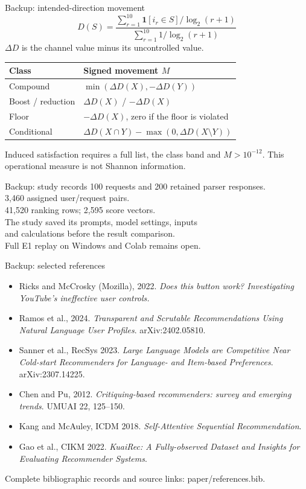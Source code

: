 \documentclass[10pt]{beamer}
\newcommand{\toprule}{\hline}
\newcommand{\midrule}{\hline}
\newcommand{\bottomrule}{\hline}
\newcommand{\src}[1]{\vfill{\tiny\color{bcitgray}#1}}
\begin{document}
\begin{frame}{Backup: intended-direction movement}
\small
\[
D(S)=\frac{\sum_{r=1}^{10}\mathbf{1}[i_r\in S]/\log_2(r+1)}{\sum_{r=1}^{10}1/\log_2(r+1)}
\]
$\Delta D$ is the channel value minus its uncontrolled value.
\begin{tabular}{@{}P{2.7cm}P{7.0cm}@{}}
\toprule
Class & Signed movement $M$\\\midrule
Compound & $\min(\Delta D(X),-\Delta D(Y))$\\
Boost / reduction & $\Delta D(X)$ / $-\Delta D(X)$\\
Floor & $-\Delta D(X)$, zero if the floor is violated\\
Conditional & $\Delta D(X\cap Y)-\max(0,\Delta D(X\setminus Y))$\\\bottomrule
\end{tabular}\par
\vspace{0.25cm}
Induced satisfaction requires a full list, the class band and $M>10^{-12}$. This operational measure is not Shannon information.
\end{frame}

\begin{frame}{Backup: study records}
\small
100 requests and 200 retained parser responses.\\
3,460 assigned user/request pairs.\\
41,520 ranking rows; 2,595 score vectors.\\[0.3cm]
The study saved its prompts, model settings, inputs\\
and calculations before the result comparison.\\[0.3cm]
Full E1 replay on Windows and Colab remains open.
\end{frame}

\begin{frame}{Backup: selected references}
\footnotesize
\begin{itemize}
\item Ricks and McCrosky (Mozilla), 2022. \emph{Does this button work? Investigating YouTube's ineffective user controls.}
\item Ramos et al., 2024. \emph{Transparent and Scrutable Recommendations Using Natural Language User Profiles}. arXiv:2402.05810.
\item Sanner et al., RecSys 2023. \emph{Large Language Models are Competitive Near Cold-start Recommenders for Language- and Item-based Preferences}. arXiv:2307.14225.
\item Chen and Pu, 2012. \emph{Critiquing-based recommenders: survey and emerging trends}. UMUAI 22, 125--150.
\item Kang and McAuley, ICDM 2018. \emph{Self-Attentive Sequential Recommendation}.
\item Gao et al., CIKM 2022. \emph{KuaiRec: A Fully-observed Dataset and Insights for Evaluating Recommender Systems}.
\end{itemize}
\src{Complete bibliographic records and source links: paper/references.bib.}
\end{frame}
\end{document}
